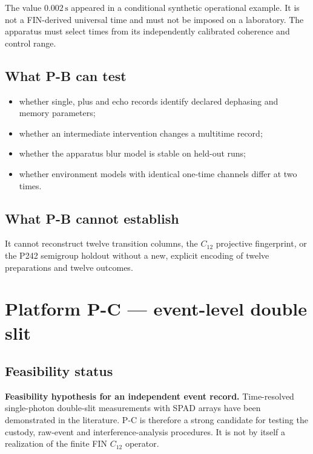 \documentclass[11pt,a4paper,openany]{report}
\begin{document}
The value \(0.002\,\mathrm{s}\) appeared in a conditional synthetic operational example. It is not a FIN-derived universal time and must not be imposed on a laboratory. The apparatus must select times from its independently calibrated coherence and control range.

\section{What P-B can test}

\begin{itemize}
\item 
whether single, plus and echo records identify declared dephasing and memory parameters;

\item 
whether an intermediate intervention changes a multitime record;

\item 
whether the apparatus blur model is stable on held-out runs;

\item 
whether environment models with identical one-time channels differ at two times.

\end{itemize}

\section{What P-B cannot establish}

It cannot reconstruct twelve transition columns, the \(C_{12}\) projective fingerprint, or the P242 semigroup holdout without a new, explicit encoding of twelve preparations and twelve outcomes.

\chapter{Platform P-C --- event-level double slit}

\section{Feasibility status}

\textbf{Feasibility hypothesis for an independent event record.} Time-resolved single-photon double-slit measurements with SPAD arrays have been demonstrated in the literature. P-C is therefore a strong candidate for testing the custody, raw-event and interference-analysis procedures. It is not by itself a realization of the finite FIN \(C_{12}\) operator.
\end{document}
